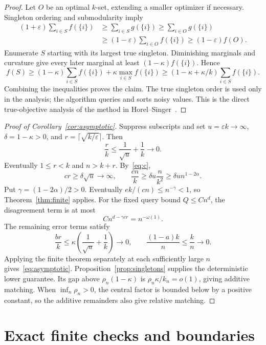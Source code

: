 \documentclass[manuscript,11pt,screen,nonacm]{acmart}
\newcommand{\eps}{\varepsilon}
\begin{document}
\begin{proof}
Let $O$ be an optimal $k$-set, extending a smaller optimizer if necessary.
Singleton ordering and submodularity imply
\begin{align*}
 (1+\eps)\sum_{i\in S}f(\{i\})
 &\ge\sum_{i\in S}g(\{i\})
 \ge\sum_{i\in O}g(\{i\})\\
 &\ge(1-\eps)\sum_{i\in O}f(\{i\})
 \ge(1-\eps)f(O).
\end{align*}
Enumerate $S$ starting with its largest true singleton. Diminishing
marginals and curvature give every later marginal at least
$(1-\kappa)f(\{i\})$. Hence
\[
 f(S)\ge(1-\kappa)\sum_{i\in S}f(\{i\})
                  +\kappa\max_{i\in S}f(\{i\})
 \ge(1-\kappa+\kappa/k)\sum_{i\in S}f(\{i\}).
\]
Combining the inequalities proves the claim. The true singleton order is
used only in the analysis; the algorithm queries and sorts noisy values.
This is the direct true-objective analysis of the method in
Horel--Singer~\cite[Proposition 8]{HorelSinger16}.
\end{proof}

\begin{proof}[Proof of Corollary~\ref{cor:asymptotic}]
Suppress subscripts and set $u=\eps k\to\infty$,
$\delta=1-\kappa>0$, and $r=\lceil\sqrt{k/\eps}\rceil$.
Then
\[
 \frac r k\le\frac1{\sqrt u}+\frac1k\to0.
\]
Eventually $1\le r<k$ and $n>k+r$. By~\eqref{eq:c},
\begin{equation}\label{eq:growth}
 cr\ge\delta\sqrt u\to\infty,\qquad
 \frac{cn}{k}\ge\delta u\frac{n}{k^2}
                      \ge\delta u n^{1-2\alpha}.
\end{equation}
Put $\gamma=(1-2\alpha)/2>0$. Eventually
$e k/(cn)\le n^{-\gamma}<1$, so Theorem~\ref{thm:finite} applies.
For the fixed query bound $Q\le C n^d$, the disagreement term is at most
\[
 C n^{d-\gamma cr}=n^{-\omega(1)}.
\]
The remaining error terms satisfy
\[
 \frac{br}{k}\le\kappa\left(\frac1{\sqrt u}+\frac1k\right)\to0,
 \qquad \frac{(1-a)k}{n}\le\frac{k}{n}\to0.
\]
Applying the finite theorem separately at each sufficiently large $n$
gives~\eqref{eq:asymptotic}. Proposition~\ref{prop:singletons} supplies
the deterministic lower guarantee. Its gap above $\rho_n(1-\kappa)$
is $\rho_n\kappa/k_n=o(1)$, giving additive matching. When
$\inf_n\rho_n>0$, the central factor is bounded below by a positive
constant, so the additive remainders also give relative matching.
\end{proof}

\section{Exact finite checks and boundaries}
\end{document}
